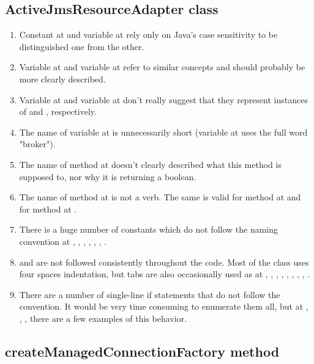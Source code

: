 \subsection{ActiveJmsResourceAdapter class}
\begin{enumerate}
	\item {} Constant  at  and variable  at  rely only on Java's case sensitivity to be distinguished one from the other. 
	\item {} Variable  at  and variable  at  refer to similar concepts and should probably be more clearly described. 
	\item {} Variable  at  and variable  at  don't really suggest that they represent instances of  and , respectively.
	\item {} The name of variable  at  is unnecessarily short (variable  at  uses the full word "broker"). 
	\item {} The name of method  at  doesn't clearly described what this method is supposed to, nor why it is returning a boolean. 
	\item {} The name of method  at  is not a verb. The same is valid for method  at  and for method  at .
	\item {} There is a huge number of constants which do not follow the naming convention at , , , , , , . 
	\item {} and  are not followed consistently throughout the code. Most of the class uses four spaces indentation, but tabs are also occasionally used as at , , , , , , , , . 
	\item {} There are a number of single-line if statements that do not follow the convention. It would be very time consuming to enumerate them all, but at , , ,  there are a few examples of this behavior. 
\end{enumerate}

\subsection{createManagedConnectionFactory method}
